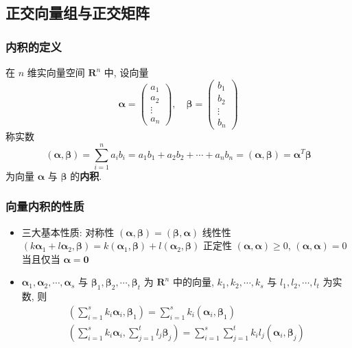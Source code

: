 \documentclass{article}
\begin{document}
		\subsection{正交向量组与正交矩阵}
			\subsubsection{内积的定义}
				在 $n$ 维实向量空间 $\mathbf{R}^{n}$ 中, 设向量
				$$
				\boldsymbol \alpha=\left(\begin{array}{c}
					a_{1} \\
					a_{2} \\
					\vdots \\
					a_{n}
				\end{array}\right), \quad \boldsymbol \beta=\left(\begin{array}{c}
					b_{1} \\
					b_{2} \\
					\vdots \\
					b_{n}
				\end{array}\right)
				$$
				称实数
				$$
				(\boldsymbol{\alpha}, \boldsymbol{\beta})=\sum_{i=1}^{n} a_{i} b_{i}=a_{1} b_{1}+a_{2} b_{2}+\cdots+a_{n} b_{n}=(\boldsymbol{\alpha}, \boldsymbol{\beta})=\boldsymbol{\alpha}^{T} \boldsymbol{\beta}
				$$
				为向量 $\boldsymbol{\alpha}$ 与 $\boldsymbol{\beta}$ 的\textbf{内积}.
			\subsubsection{向量内积的性质}
				\begin{itemize}
					\item 三大基本性质:
						\subitem 对称性 $(\boldsymbol{\alpha}, \boldsymbol{\beta})=(\boldsymbol{\beta}, \boldsymbol{\alpha})$
						\subitem 线性性 $\left(k\boldsymbol{\alpha}_{1}+l\boldsymbol{\alpha}_{2}, \boldsymbol{\beta}\right)=k\left(\boldsymbol{\alpha}_{1}, 	\boldsymbol{\beta}\right)+l\left(\boldsymbol{\alpha}_{2}, \boldsymbol{\beta}\right)$
						\subitem 正定性 $(\boldsymbol{\alpha}, \boldsymbol{\alpha}) \geqslant 0$, $(\boldsymbol{\alpha}, \boldsymbol{\alpha})=0$ 当且仅当 $\boldsymbol{\alpha}=\mathbf{0}$
					\item $\boldsymbol{\alpha}_{1}, \boldsymbol{\alpha}_{2}, \cdots, \boldsymbol{\alpha}_{s}$ 与 $\boldsymbol{\beta}_{1}, \boldsymbol{\beta}_{2}, \cdots, \boldsymbol{\beta}_{t}$ 为 $\mathbf{R}^{n}$ 中的向量, $k_{1}, k_{2}, \cdots, k_{s}$ 与 $l_{1}, l_{2}, \cdots, l_{t}$ 为实数, 则
					$$
					\begin{gathered}
						\left(\sum_{i=1}^{s} k_{i} \boldsymbol\alpha_{i}, \boldsymbol{\beta}_{1}\right)=\sum_{i=1}^{s} k_{i}\left(\boldsymbol{\alpha}_{i}, \boldsymbol{\beta}_{1}\right) \\
						\left(\sum_{i=1}^{s} k_{i} \boldsymbol{\alpha}_{i}, \sum_{j=1}^{t} l_{j} \boldsymbol{\beta}_{j}\right)=\sum_{i=1}^{s} \sum_{j=1}^{t} k_{i} l_{j}\left(\boldsymbol{\alpha}_{i}, \boldsymbol{\beta}_{j}\right)
					\end{gathered}
					$$
				\end{itemize}
\end{document}
